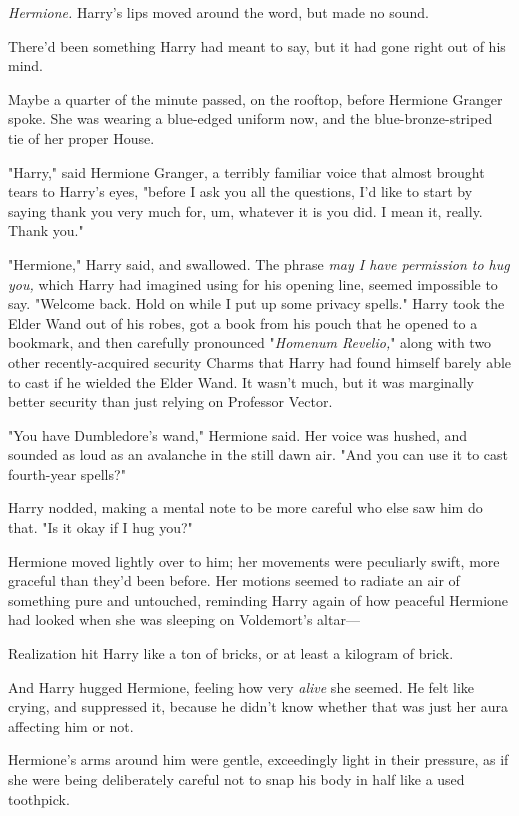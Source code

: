 \emph{Hermione.} Harry's lips moved around the word, but made no sound.

There'd been something Harry had meant to say, but it had gone right out of his
mind.

Maybe a quarter of the minute passed, on the rooftop, before Hermione Granger
spoke. She was wearing a blue-edged uniform now, and the blue-bronze-striped
tie of her proper House.

"Harry," said Hermione Granger, a terribly familiar voice that almost brought
tears to Harry's eyes, "before I ask you all the questions, I'd like to start
by saying thank you very much for, um, whatever it is you did. I mean it,
really. Thank you."

"Hermione," Harry said, and swallowed. The phrase \emph{may I have permission
to hug you,} which Harry had imagined using for his opening line, seemed
impossible to say. "Welcome back. Hold on while I put up some privacy spells."
Harry took the Elder Wand out of his robes, got a book from his pouch that he
opened to a bookmark, and then carefully pronounced "\emph{Homenum Revelio,}"
along with two other recently-acquired security Charms that Harry had found
himself barely able to cast if he wielded the Elder Wand. It wasn't much, but
it was marginally better security than just relying on Professor Vector.

"You have Dumbledore's wand," Hermione said. Her voice was hushed, and sounded
as loud as an avalanche in the still dawn air. "And you can use it to cast
fourth-year spells?"

Harry nodded, making a mental note to be more careful who else saw him do that.
"Is it okay if I hug you?"

Hermione moved lightly over to him; her movements were peculiarly swift, more
graceful than they'd been before. Her motions seemed to radiate an air of
something pure and untouched, reminding Harry again of how peaceful Hermione
had looked when she was sleeping on Voldemort's altar—

Realization hit Harry like a ton of bricks, or at least a kilogram of brick.

And Harry hugged Hermione, feeling how very \emph{alive} she seemed. He felt
like crying, and suppressed it, because he didn't know whether that was just
her aura affecting him or not.

Hermione's arms around him were gentle, exceedingly light in their pressure, as
if she were being deliberately careful not to snap his body in half like a used
toothpick.

